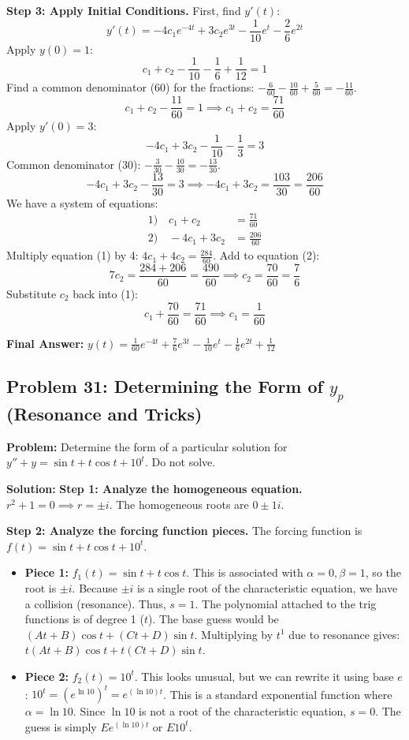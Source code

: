 \documentclass[12pt]{article}
\begin{document}
\textbf{Step 3: Apply Initial Conditions.}
First, find $y'(t)$:
\[ y'(t) = -4c_1 e^{-4t} + 3c_2 e^{3t} - \frac{1}{10}e^t - \frac{2}{6}e^{2t} \]
Apply $y(0) = 1$:
\[ c_1 + c_2 - \frac{1}{10} - \frac{1}{6} + \frac{1}{12} = 1 \]
Find a common denominator (60) for the fractions: $-\frac{6}{60} - \frac{10}{60} + \frac{5}{60} = -\frac{11}{60}$.
\[ c_1 + c_2 - \frac{11}{60} = 1 \implies c_1 + c_2 = \frac{71}{60} \]
Apply $y'(0) = 3$:
\[ -4c_1 + 3c_2 - \frac{1}{10} - \frac{1}{3} = 3 \]
Common denominator (30): $-\frac{3}{30} - \frac{10}{30} = -\frac{13}{30}$.
\[ -4c_1 + 3c_2 - \frac{13}{30} = 3 \implies -4c_1 + 3c_2 = \frac{103}{30} = \frac{206}{60} \]
We have a system of equations:
\begin{align*}
1) \quad c_1 + c_2 &= \frac{71}{60} \\
2) \quad -4c_1 + 3c_2 &= \frac{206}{60}
\end{align*}
Multiply equation (1) by 4: $4c_1 + 4c_2 = \frac{284}{60}$.
Add to equation (2):
\[ 7c_2 = \frac{284 + 206}{60} = \frac{490}{60} \implies c_2 = \frac{70}{60} = \frac{7}{6} \]
Substitute $c_2$ back into (1):
\[ c_1 + \frac{70}{60} = \frac{71}{60} \implies c_1 = \frac{1}{60} \]

\textbf{Final Answer:} $y(t) = \frac{1}{60} e^{-4t} + \frac{7}{6} e^{3t} - \frac{1}{10}e^t - \frac{1}{6}e^{2t} + \frac{1}{12}$

\subsection{Problem 31: Determining the Form of $y_p$ (Resonance and Tricks)}
\textbf{Problem:} Determine the form of a particular solution for $y'' + y = \sin t + t \cos t + 10^t$. Do not solve.

\textbf{Solution:}
\textbf{Step 1: Analyze the homogeneous equation.}
$r^2 + 1 = 0 \implies r = \pm i$.
The homogeneous roots are $0 \pm 1i$.

\textbf{Step 2: Analyze the forcing function pieces.}
The forcing function is $f(t) = \sin t + t \cos t + 10^t$.
\begin{itemize}
    \item \textbf{Piece 1:} $f_1(t) = \sin t + t \cos t$. This is associated with $\alpha = 0, \beta = 1$, so the root is $\pm i$. Because $\pm i$ is a single root of the characteristic equation, we have a collision (resonance). Thus, $s = 1$. The polynomial attached to the trig functions is of degree 1 ($t$).
    The base guess would be $(At + B)\cos t + (Ct + D)\sin t$.
    Multiplying by $t^1$ due to resonance gives: $t(At + B)\cos t + t(Ct + D)\sin t$.
    \item \textbf{Piece 2:} $f_2(t) = 10^t$. This looks unusual, but we can rewrite it using base $e$: $10^t = (e^{\ln 10})^t = e^{(\ln 10)t}$. This is a standard exponential function where $\alpha = \ln 10$. Since $\ln 10$ is not a root of the characteristic equation, $s = 0$.
    The guess is simply $E e^{(\ln 10)t}$ or $E 10^t$.
\end{itemize}
\end{document}
